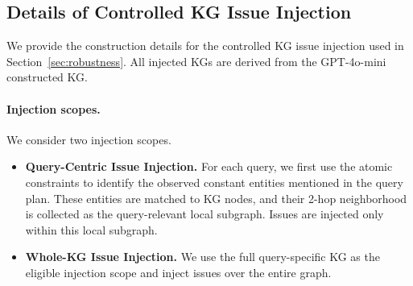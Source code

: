 \documentclass{article}
\theoremstyle{plain}
\theoremstyle{definition}
\theoremstyle{remark}
\begin{document}


\subsection{Details of Controlled KG Issue Injection}
\label{app:issue_injection}

We provide the construction details for the controlled KG issue injection used in Section~\ref{sec:robustness}. All injected KGs are derived from the GPT-4o-mini constructed KG. 

\paragraph{Injection scopes.}
We consider two injection scopes.

\begin{itemize}
    \item \textbf{Query-Centric Issue Injection.}
    For each query, we first use the atomic constraints to identify the observed constant entities mentioned in the query plan. These entities are matched to KG nodes, and their 2-hop neighborhood is collected as the query-relevant local subgraph. Issues are injected only within this local subgraph. 

    \item \textbf{Whole-KG Issue Injection.}
    We use the full query-specific KG as the eligible injection scope and inject issues over the entire graph. 
\end{itemize}
\end{document}
